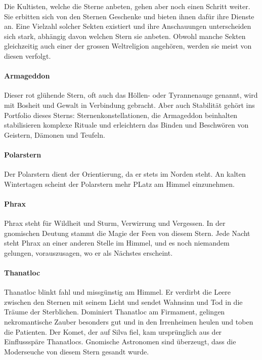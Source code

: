 \documentclass[12pt,twoside,twocolumn,openany]{book}
\begin{document}
	Die Kultisten, welche die Sterne anbeten, gehen aber noch einen Schritt weiter. Sie erbitten sich von den Sternen Geschenke und bieten ihnen dafür ihre Dienste an. Eine Vielzahl solcher Sekten existiert und ihre Anschauungen unterscheiden sich stark, abhängig davon welchen Stern sie anbeten. Obwohl manche Sekten gleichzeitig auch einer der grossen Weltreligion angehören, werden sie meist von diesen verfolgt.
	
	\paragraph{Armageddon}
	Dieser rot glühende Stern, oft auch das Höllen- oder Tyrannenauge genannt, wird mit Bosheit und Gewalt in Verbindung gebracht. Aber auch Stabilität gehört ins Portfolio dieses Sterns: Sternenkonstellationen, die Armageddon beinhalten stabilisieren komplexe Rituale und erleichtern das Binden und Beschwören von Geistern, Dämonen und Teufeln.
	
	\paragraph{Polarstern}
	Der Polarstern dient der Orientierung, da er stets im Norden steht. An kalten Wintertagen scheint der Polarstern mehr PLatz am Himmel einzunehmen. 
	
	\paragraph{Phrax}
	Phrax steht für Wildheit und Sturm, Verwirrung und Vergessen. In der gnomischen Deutung stammt die Magie der Feen von diesem Stern. Jede Nacht steht Phrax an einer anderen Stelle im Himmel, und es noch niemandem gelungen, vorauszusagen, wo er als Nächstes erscheint.
	
	\paragraph{Thanatloc}
	Thanatloc blinkt fahl und missgünstig am Himmel. Er verdirbt die Leere zwischen den Sternen mit seinem Licht und sendet Wahnsinn und Tod in die Träume der Sterblichen. Dominiert Thanatloc am Firmament, gelingen nekromantische Zauber besonders gut und in den Irrenheimen heulen und toben die Patienten. Der Komet, der auf Silva fiel, kam ursprünglich aus der Einflussspäre Thanatlocs. Gnomische Astronomen sind überzeugt, dass die Moderseuche von diesem Stern gesandt wurde.
\end{document}
